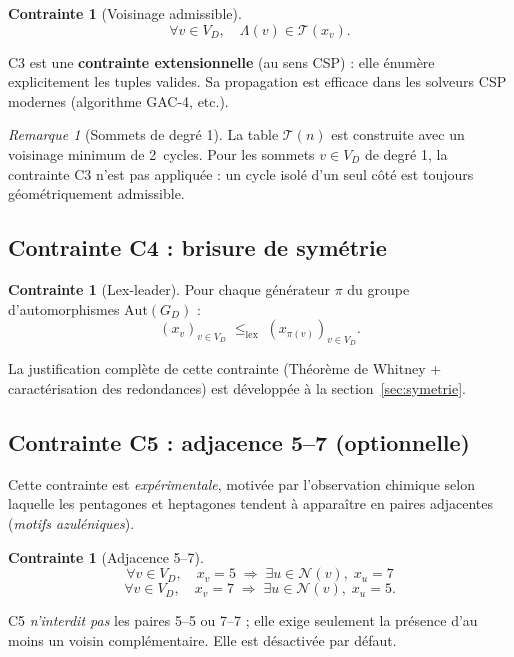 \documentclass[12pt,a4paper]{article}
\theoremstyle{definition}
\newtheorem{contrainte}[definition]{Contrainte}
\theoremstyle{remark}
\newtheorem{remarque}[definition]{Remarque}
\newcommand{\GD}{G_{\!D}}
\newcommand{\VD}{V_{\!D}}
\newcommand{\xv}{x_v}
\newcommand{\Aut}{\mathrm{Aut}}
\newcommand{\NN}{\mathcal{N}}
\begin{document}
\begin{contrainte}[Voisinage admissible]
\label{c:voisinage}
\[
  \forall v \in \VD,\quad \Lambda(v) \in \mathcal{T}(\xv).
\]
\end{contrainte}

C3 est une \textbf{contrainte extensionnelle} (au sens CSP) : elle
\'enum\`ere explicitement les tuples valides. Sa propagation est
efficace dans les solveurs CSP modernes (algorithme GAC-4, etc.).

\begin{remarque}[Sommets de degr\'e 1]
La table $\mathcal{T}(n)$ est construite avec un voisinage minimum de
2~cycles. Pour les sommets $v \in \VD$ de degr\'e 1, la contrainte C3
n'est pas appliqu\'ee : un cycle isol\'e d'un seul c\^ot\'e est toujours
g\'eom\'etriquement admissible.
\end{remarque}

\subsection{Contrainte C4 : brisure de sym\'etrie}

\begin{contrainte}[Lex-leader]
\label{c:lex}
Pour chaque g\'en\'erateur $\pi$ du groupe d'automorphismes
$\Aut(\GD)$ :
\[
  (\xv)_{v \in \VD}
  \;\leq_{\mathrm{lex}}\;
  (x_{\pi(v)})_{v \in \VD}.
\]
\end{contrainte}

La justification compl\`ete de cette contrainte (Th\'eor\`eme de
Whitney + caract\'erisation des redondances) est d\'evelopp\'ee
\`a la section~\ref{sec:symetrie}.

\subsection{Contrainte C5 : adjacence 5--7 (optionnelle)}

Cette contrainte est \emph{exp\'erimentale}, motiv\'ee par l'observation
chimique selon laquelle les pentagones et heptagones tendent \`a appara\^itre
en paires adjacentes (\emph{motifs azul\'eniques}).

\begin{contrainte}[Adjacence 5--7]
\label{c:adj57}
\[
  \forall v \in \VD,\quad
  \xv = 5 \;\Longrightarrow\; \exists u \in \NN(v),\; x_u = 7
\]
\[
  \forall v \in \VD,\quad
  \xv = 7 \;\Longrightarrow\; \exists u \in \NN(v),\; x_u = 5.
\]
\end{contrainte}

C5 \emph{n'interdit pas} les paires 5--5 ou 7--7 ; elle exige seulement
la pr\'esence d'au moins un voisin compl\'ementaire. Elle est
d\'esactiv\'ee par d\'efaut.
\end{document}
